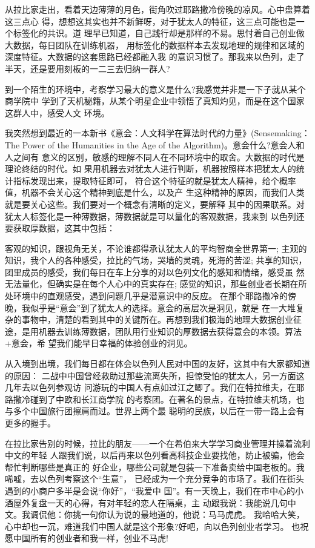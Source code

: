 \documentclass[11pt]{ctexart}
\begin{document}
{{{{从拉比家走出，看着天边薄薄的月色，街角吹过耶路撒冷傍晚的凉风。心中盘算着这三点心
得，想想这其实也并不新鲜呀，对于犹太人的特征，这三点可能也是一个标签化的共识。道
理早已知道，自己践行却是那样的不易。思忖着自己创业做大数据，每日团队在训练机器，
用标签化的数据样本去发现地理的规律和区域的深度特征。大数据的这套思路已经都融入我
的意识习惯了。那我来以色列，走了半天，还是要用刻板的一二三去归纳一群人?

到一个陌生的环境中，考察学习最大的意义是什么?我感觉并非是一下子就从某个商学院中
学到了天机秘籍，从某个明星企业中领悟了真知灼见，而是在这个国家这群人中，感受人文
环境。

我突然想到最近的一本新书《意会：人文科学在算法时代的力量》(Sensemaking：The
Power of the Humanities in the Age of the Algorithm)。意会什么?意会人和人之间有
意义的区别，敏感的理解不同人在不同环境中的取舍。大数据的时代是理论终结的时代。如
果用机器去对犹太人进行判断，机器按照样本把犹太人的统计指标发现出来，提取特征即可，
符合这个特征的就是犹太人精神，给个概率值，机器不会关心这个精神到底是什么，以及产
生这种精神的原因，而我们人类就是要关心这些。我们要对一个概念有清晰的定义，要解释
其中的因果联系。对犹太人标签化是一种薄数据，薄数据就是可以量化的客观数据，我来到
以色列还要获取厚数据，这其中包括：

客观的知识，跟视角无关，不论谁都得承认犹太人的平均智商全世界第一;
主观的知识，我个人的各种感受，拉比的气场，哭墙的灵魂，死海的苦涩;
共享的知识，团里成员的感受，我们每日在车上分享的对以色列文化的感知和情绪，感受虽
然无法量化，但确实是在每个人心中的真实存在;
感觉的知识，那些创业者长期在所处环境中的直观感受，遇到问题几乎是潜意识中的反应。
在那个耶路撒冷的傍晚，我似乎是“意会”到了犹太人的选择。意会的高层次是洞见，就是
在一大堆复杂的事物中，清楚的看到其中的关键所在。再想到我们极海的地理大数据创业征
途，是用机器去训练薄数据，团队用行业知识的厚数据去获得意会的本领。算法+意会，希
望我们能早日幸福的体验创业的洞见。

从入境到出境，我们每日都在体会以色列人民对中国的友好，这其中有大家都知道的原因：
二战中中国曾经救助过那些流离失所，担惊受怕的犹太人，另一方面这几年去以色列参观访
问游玩的中国人有点如过江之鲫了。我们在特拉维夫，在耶路撒冷碰到了中欧和长江商学院
的考察团。在著名的景点，在特拉维夫机场，也与多个中国旅行团擦肩而过。世界上两个最
聪明的民族，以后在一带一路上会有更多的握手。

在拉比家告别的时候，拉比的朋友——一个在希伯来大学学习商业管理并操着流利中文的年轻
人跟我们说，以后再来以色列看高科技企业要找他，防止被骗，他会帮忙判断哪些是真正的
好企业，哪些公司就是包装一下准备卖给中国老板的。我唏嘘，去以色列考察这个“生意”，
已经成为一个充分竞争的市场了。我们在街头遇到的小商户多半是会说“你好”，“我爱中
国”。有一天晚上，我们在市中心的小酒屋外复盘一天的心得，有对年轻的恋人在隔桌，主
动跟我说：我能说几句中文。我调侃他：你挑一句你认为说的最地道的，他说：马马虎虎。
我哈哈大笑，心中却也一沉，难道我们中国人就是这个形象?好吧，向以色列创业者学习。
也祝愿中国所有的创业者和我一样，创业不马虎!

}}}}
\end{document}
